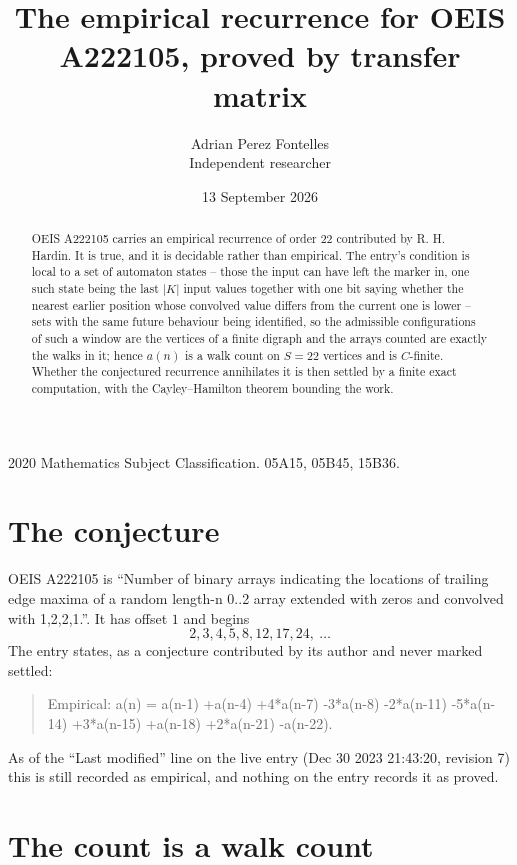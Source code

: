 \documentclass[11pt,a4paper]{article}
\title{The empirical recurrence for OEIS A222105, proved by transfer matrix}
\author{Adrian Perez Fontelles\\ \small Independent researcher}
\date{13 September 2026}
\theoremstyle{plain}
\theoremstyle{definition}
\begin{document}
\maketitle

\begin{abstract}
OEIS A222105 carries an empirical recurrence of order $22$ contributed by R. H. Hardin. It is
true, and it is decidable rather than empirical. The entry's condition is local to a set of automaton states -- those the input can have left the marker in, one such state being the last $|K|$ input values together with one bit saying whether the nearest earlier position whose convolved value differs from the current one is lower -- sets with the same future behaviour being identified, so
the admissible configurations of such a window are the vertices of a finite digraph and the
arrays counted are exactly the walks in it; hence $a(n)$ is a walk count on $S=22$ vertices
and is $C$-finite. Whether the conjectured recurrence annihilates it is then settled by a
finite exact computation, with the Cayley--Hamilton theorem bounding the work.
\end{abstract}

\noindent\small 2020 Mathematics Subject Classification. 05A15, 05B45, 15B36.\normalsize

\section{The conjecture}

OEIS A222105 is ``Number of binary arrays indicating the locations of trailing edge maxima of a random length-n 0..2 array extended with zeros and convolved with 1,2,2,1.''. It has offset $1$ and begins
\[
2, 3, 4, 5, 8, 12, 17, 24,\ \dots
\]
The entry states, as a conjecture contributed by its author and never marked settled:
\begin{quote}
Empirical: a(n) = a(n-1) +a(n-4) +4*a(n-7) -3*a(n-8) -2*a(n-11) -5*a(n-14) +3*a(n-15) +a(n-18) +2*a(n-21) -a(n-22).
\end{quote}
As of the ``Last modified'' line on the live entry (Dec 30 2023 21:43:20, revision 7) this is still
recorded as empirical, and nothing on the entry records it as proved.

\section{The count is a walk count}
\end{document}
